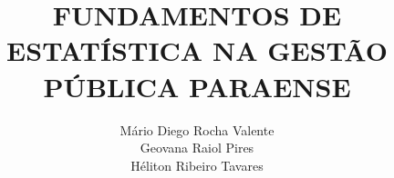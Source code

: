 

\title{FUNDAMENTOS DE ESTATÍSTICA NA GESTÃO PÚBLICA PARAENSE} 



\author{Mário Diego Rocha Valente  \\  Geovana Raiol Pires \\ Héliton Ribeiro Tavares }


\renewcommand{\lsISBNdigital}{000-0-000000-00-0}
\renewcommand{\lsISBNhardcover}{000-0-000000-00-0}
\renewcommand{\lsISBNsoftcover}{000-0-000000-00-0}
\renewcommand{\lsISBNsoftcoverus}{000-0-000000-00-0}
\renewcommand{\lsSeries}{cfls} %
\renewcommand{\lsSeriesNumber}{99} %


\setlength{\csspine}{25.0559784mm} %
\setlength{\bodspine}{20mm} %
